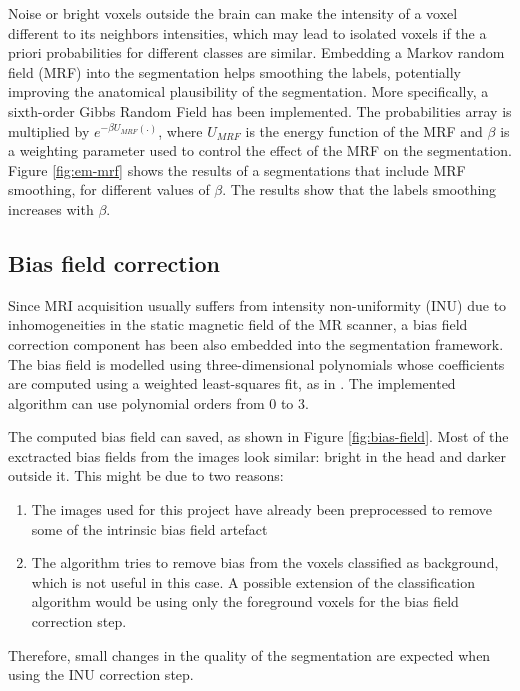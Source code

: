 
Noise or bright voxels outside the brain can make the intensity of a voxel different to its neighbors intensities, which may lead to isolated voxels if the a priori probabilities for different classes are similar. Embedding a Markov random field (MRF) into the segmentation helps smoothing the labels, potentially improving the anatomical plausibility of the segmentation. More specifically, a sixth-order Gibbs Random Field has been implemented. The probabilities array is multiplied by $e^{- \beta U_{MRF}(.)}$, where $U_{MRF}$ is the energy function of the MRF and $\beta$ is a weighting parameter used to control the effect of the MRF on the segmentation. Figure \ref{fig:em-mrf} shows the results of a segmentations that include MRF smoothing, for different values of $\beta$. The results show that the labels smoothing increases with $\beta$.



\subsection{Bias field correction}


Since MRI acquisition usually suffers from intensity non-uniformity (INU) due to inhomogeneities in the static magnetic field of the MR scanner, a bias field correction component has been also embedded into the segmentation framework. The bias field is modelled using three-dimensional polynomials whose coefficients are computed using a weighted least-squares fit, as in \cite{leemput_automated_1999}. The implemented algorithm can use polynomial orders from 0 to 3.

The computed bias field can saved, as shown in Figure \ref{fig:bias-field}. Most of the exctracted bias fields from the images look similar: bright in the head and darker outside it. This might be due to two reasons:
\begin{enumerate}
  \item The images used for this project have already been preprocessed to remove some of the intrinsic bias field artefact
  \item The algorithm tries to remove bias from the voxels classified as background, which is not useful in this case. A possible extension of the classification algorithm would be using only the foreground voxels for the bias field correction step.
\end{enumerate}
Therefore, small changes in the quality of the segmentation are expected when using the INU correction step.

